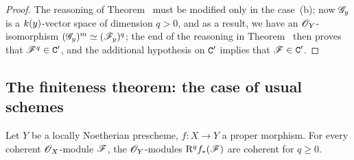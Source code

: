 \begin{proof}
\label{proof-3.3.1.3}
The reasoning of Theorem~ must be modified only in the case~(b); now $\mathscr{G}_y$ is a $k(y)$-vector space of dimension $q>0$, and as a result, we have an $\mathscr{O}_Y$-isomorphism $(\mathscr{G}_y)^m\simeq(\mathscr{F}_y)^q$; the end of the reasoning in Theorem~ then proves that $\mathscr{F}^q\in\mathtt{C}'$, and the additional hypothesis on $\mathtt{C}'$ implies that $\mathscr{F}\in\mathtt{C}'$.
\end{proof}

\subsection{The finiteness theorem: the case of usual schemes}
\label{subsection:3.3.2}

\begin{thm}[3.2.1]
\label{3.3.2.1}
Let $Y$ be a locally Noetherian prescheme, $f:X\to Y$ a proper morphism.
For every coherent $\mathscr{O}_X$-module $\mathscr{F}$, the $\mathscr{O}_Y$-modules $\mathrm{R}^q f_*(\mathscr{F})$ are coherent for $q\geq 0$.
\end{thm}

